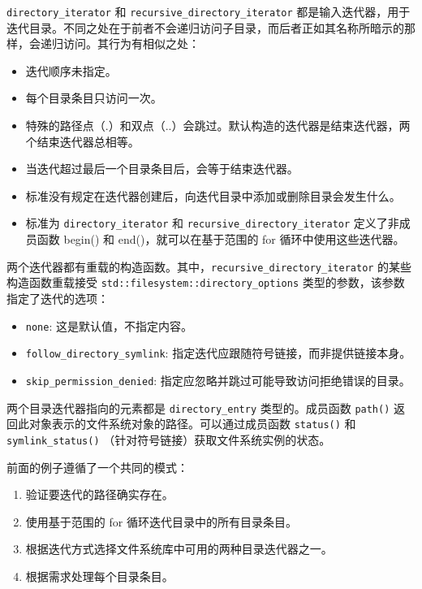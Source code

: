 
\verb|directory_iterator| 和 \verb|recursive_directory_iterator| 都是输入迭代器，用于迭代目录。不同之处在于前者不会递归访问子目录，而后者正如其名称所暗示的那样，会递归访问。其行为有相似之处：

\begin{itemize}
\item
迭代顺序未指定。

\item
每个目录条目只访问一次。

\item
特殊的路径点（.）和双点（..）会跳过。默认构造的迭代器是结束迭代器，两个结束迭代器总相等。

\item
当迭代超过最后一个目录条目后，会等于结束迭代器。

\item
标准没有规定在迭代器创建后，向迭代目录中添加或删除目录会发生什么。

\item
标准为 \verb|directory_iterator| 和 \verb|recursive_directory_iterator| 定义了非成员函数 begin() 和 end()，就可以在基于范围的 for 循环中使用这些迭代器。
\end{itemize}

两个迭代器都有重载的构造函数。其中，\verb|recursive_directory_iterator| 的某些构造函数重载接受 \verb|std::filesystem::directory_options| 类型的参数，该参数指定了迭代的选项：

\begin{itemize}
\item
\verb|none|: 这是默认值，不指定内容。

\item
\verb|follow_directory_symlink|: 指定迭代应跟随符号链接，而非提供链接本身。

\item
\verb|skip_permission_denied|: 指定应忽略并跳过可能导致访问拒绝错误的目录。
\end{itemize}

两个目录迭代器指向的元素都是 \verb|directory_entry| 类型的。成员函数 \verb|path()| 返回此对象表示的文件系统对象的路径。可以通过成员函数 \verb|status()| 和 \verb|symlink_status()| （针对符号链接）获取文件系统实例的状态。

前面的例子遵循了一个共同的模式：

\begin{enumerate}
\item
验证要迭代的路径确实存在。

\item
使用基于范围的 for 循环迭代目录中的所有目录条目。

\item
根据迭代方式选择文件系统库中可用的两种目录迭代器之一。

\item
根据需求处理每个目录条目。
\end{enumerate}


